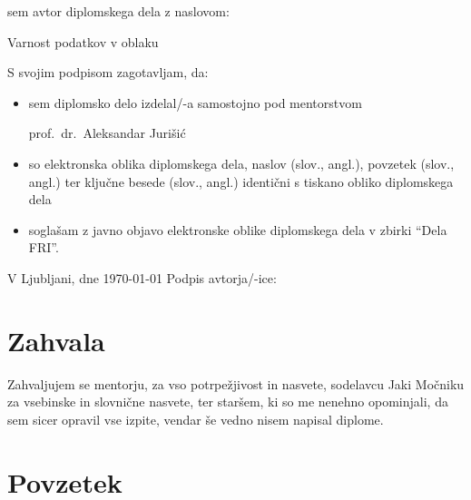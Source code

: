 \documentclass[12pt,a4paper,openany,tikz]{book}
\theoremstyle{plain}
\theoremstyle{definition}
\begin{document}
\vspace{1cm}
sem avtor diplomskega dela z naslovom:

\vspace{0.5cm}
\begin{center}
Varnost podatkov v oblaku
\end{center}

\vspace{1.5cm}
S svojim podpisom zagotavljam, da:
\begin{itemize}
	\item sem diplomsko delo izdelal/-a samostojno pod mentorstvom

	prof.\ dr.\ Aleksandar Jurišić

	\item	so elektronska oblika diplomskega dela, naslov (slov., angl.), povzetek (slov., angl.) ter ključne besede (slov., angl.) identični s tiskano obliko diplomskega dela
	\item soglašam z javno objavo elektronske oblike diplomskega dela v zbirki ``Dela FRI''.
\end{itemize}

\vspace{1cm}
V Ljubljani, dne \today \hspace{1cm} Podpis avtorja/-ice:

\cleardoublepage
\chapter*{Zahvala}

Zahvaljujem se mentorju, za vso potrpežjivost in nasvete, sodelavcu Jaki Močniku za vsebinske in slovnične nasvete, ter staršem, ki so me nenehno opominjali, da sem sicer opravil vse izpite, vendar še vedno nisem napisal diplome.

\tableofcontents


{\let\cleardoublepage\clearpage
\setcounter{page}{1}
\frontmatter
\glsaddall{}
\printglossary[title=Slovarček]{}
\printglossary[type=\acronymtype,title=Seznam kratic in okrajšav]{}
}



\cleardoublepage
\chapter*{Povzetek}
\end{document}
